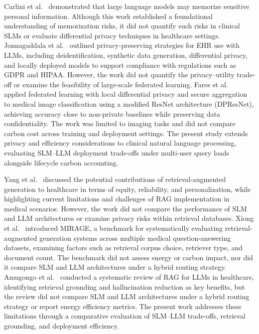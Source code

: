 Carlini et al.~\cite{carlini2021memorization} demonstrated that large language models may memorize sensitive personal information. Although this work established a foundational understanding of memorization risks, it did not quantify such risks in clinical SLMs or evaluate differential privacy techniques in healthcare settings. Jonnagaddala et al.~\cite{jonnagaddala2025privacy} outlined privacy-preserving strategies for EHR use with LLMs, including deidentification, synthetic data generation, differential privacy, and locally deployed models to support compliance with regulations such as GDPR and HIPAA. However, the work did not quantify the privacy--utility trade-off or examine the feasibility of large-scale federated learning. Fares et al.~\cite{fares2024federated} applied federated learning with local differential privacy and secure aggregation to medical image classification using a modified ResNet architecture (DPResNet), achieving accuracy close to non-private baselines while preserving data confidentiality. The work was limited to imaging tasks and did not compare carbon cost across training and deployment settings. The present study extends privacy and efficiency considerations to clinical natural language processing, evaluating SLM--LLM deployment trade-offs under multi-user query loads alongside lifecycle carbon accounting.

Yang et al.~\cite{yang2025rag} discussed the potential contributions of retrieval-augmented generation to healthcare in terms of equity, reliability, and personalization, while highlighting current limitations and challenges of RAG implementation in medical scenarios. However, the work did not compare the performance of SLM and LLM architectures or examine privacy risks within retrieval databases. Xiong et al.~\cite{xiong2024rag} introduced MIRAGE, a benchmark for systematically evaluating retrieval-augmented generation systems across multiple medical question-answering datasets, examining factors such as retrieval corpus choice, retriever type, and document count. The benchmark did not assess energy or carbon impact, nor did it compare SLM and LLM architectures under a hybrid routing strategy. Amugongo et al.~\cite{amugongo2025retrieval} conducted a systematic review of RAG for LLMs in healthcare, identifying retrieval grounding and hallucination reduction as key benefits, but the review did not compare SLM and LLM architectures under a hybrid routing strategy or report energy efficiency metrics. The present work addresses these limitations through a comparative evaluation of SLM--LLM trade-offs, retrieval grounding, and deployment efficiency.

